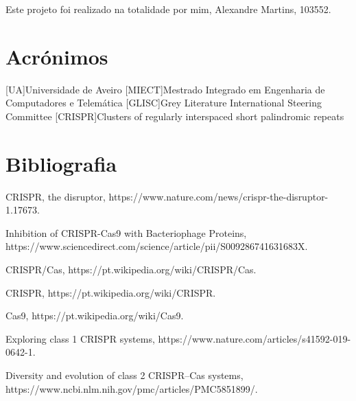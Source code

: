 \documentclass{report}
\begin{document}
Este projeto foi realizado na totalidade por mim, Alexandre Martins, 103552.

\chapter*{Acrónimos}
\begin{acronym}
[UA]{Universidade de Aveiro}
[MIECT]{Mestrado Integrado em Engenharia de Computadores e Telemática}
[GLISC]{Grey Literature International Steering Committee}
[CRISPR]{Clusters of regularly interspaced short palindromic repeats}



\end{acronym}


\chapter*{Bibliografia}
\begin{flushleft}

CRISPR, the disruptor, https://www.nature.com/news/crispr-the-disruptor-1.17673.\par




Inhibition of CRISPR-Cas9 with Bacteriophage Proteins, https://www.sciencedirect.com/science/article/pii/S009286741631683X.\par




CRISPR/Cas, https://pt.wikipedia.org/wiki/CRISPR/Cas.\par
CRISPR, https://pt.wikipedia.org/wiki/CRISPR.\par
Cas9, https://pt.wikipedia.org/wiki/Cas9.\par
Exploring class 1 CRISPR systems, https://www.nature.com/articles/s41592-019-0642-1.\par
Diversity and evolution of class 2 CRISPR–Cas systems, https://www.ncbi.nlm.nih.gov/pmc/articles/PMC5851899/.

\end{flushleft}


\printbibliography
\end{document}
